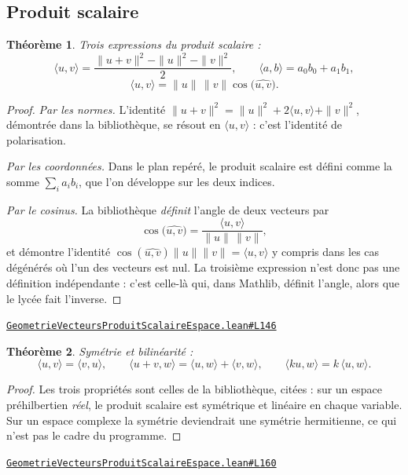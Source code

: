 \documentclass[11pt,a4paper]{article}
\theoremstyle{definition}
\theoremstyle{plain}
\newtheorem{theoreme}{Théorème}
\newcommand{\source}[2]{\par\smallskip\noindent\hfill{\footnotesize\href{#1}{\texttt{#2}}}\par\smallskip}
\begin{document}
\subsection{Produit scalaire}

\begin{theoreme}
Trois expressions du produit scalaire :
\[ \langle u, v\rangle = \frac{\|u + v\|^{2} - \|u\|^{2} - \|v\|^{2}}{2} , \qquad
   \langle a, b\rangle = a_0 b_0 + a_1 b_1 , \]
\[ \langle u, v\rangle = \|u\|\,\|v\|\cos\bigl(\widehat{u, v}\bigr) . \]
\end{theoreme}

\begin{proof}
\emph{Par les normes.} L'identité $\|u + v\|^{2} = \|u\|^{2} + 2\langle u, v\rangle +
\|v\|^{2}$, démontrée dans la bibliothèque, se résout en $\langle u, v\rangle$ : c'est
l'identité de polarisation.

\emph{Par les coordonnées.} Dans le plan repéré, le produit scalaire est défini comme la
somme $\sum_i a_i b_i$, que l'on développe sur les deux indices.

\emph{Par le cosinus.} La bibliothèque \emph{définit} l'angle de deux vecteurs par
\[ \cos\bigl(\widehat{u, v}\bigr) = \frac{\langle u, v\rangle}{\|u\|\,\|v\|} , \]
et démontre l'identité $\cos(\widehat{u,v}) \|u\| \|v\| = \langle u, v\rangle$ y compris
dans les cas dégénérés où l'un des vecteurs est nul. La troisième expression n'est donc
pas une définition indépendante : c'est celle-là qui, dans Mathlib, définit l'angle, alors
que le lycée fait l'inverse.
\end{proof}
\source{https://github.com/Commutator-IO/learn-lean/blob/main/cours/02-lycee/08-geometrie-vecteurs-produit-scalaire-espace/GeometrieVecteursProduitScalaireEspace.lean\#L146}{GeometrieVecteursProduitScalaireEspace.lean\#L146}

\begin{theoreme}
Symétrie et bilinéarité :
\[ \langle u, v\rangle = \langle v, u\rangle, \qquad
   \langle u + v, w\rangle = \langle u, w\rangle + \langle v, w\rangle, \qquad
   \langle k u, w\rangle = k\,\langle u, w\rangle . \]
\end{theoreme}

\begin{proof}
Les trois propriétés sont celles de la bibliothèque, citées : sur un espace préhilbertien
\emph{réel}, le produit scalaire est symétrique et linéaire en chaque variable. Sur un
espace complexe la symétrie deviendrait une symétrie hermitienne, ce qui n'est pas le cadre
du programme.
\end{proof}
\source{https://github.com/Commutator-IO/learn-lean/blob/main/cours/02-lycee/08-geometrie-vecteurs-produit-scalaire-espace/GeometrieVecteursProduitScalaireEspace.lean\#L160}{GeometrieVecteursProduitScalaireEspace.lean\#L160}
\end{document}
